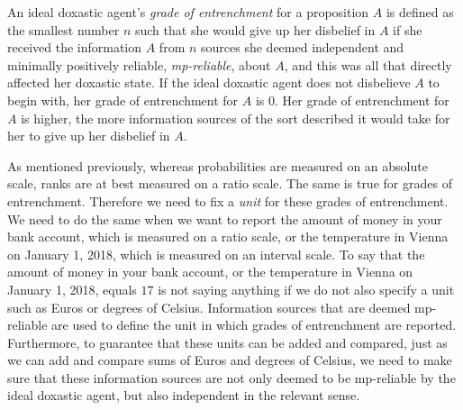 An ideal doxastic agent's \emph{grade of entrenchment} for a proposition $A$ is defined as the smallest number $n$ such that she would give up her disbelief in $A$ if she received the information $A$ from $n$ sources she deemed independent and minimally positively reliable, \textit{mp-reliable}, about $A$, and this was all that directly affected her doxastic state. If the ideal doxastic agent does not disbelieve $A$ to begin with, her grade of entrenchment for $A$ is $0$. Her grade of entrenchment for $A$ is higher, the more information sources of the sort described it would take for her to give up her disbelief in $A$.

As mentioned previously, whereas probabilities are measured on an absolute scale, ranks are at best measured on a ratio scale. The same is true for grades of entrenchment. Therefore we need to fix a \emph{unit} for these grades of entrenchment. We need to do the same when we want to report the amount of money in your bank account, which is measured on a ratio scale, or the temperature in Vienna on January 1, 2018, which is measured on an interval scale. To say that the amount of money in your bank account, or the temperature in Vienna on January 1, 2018, equals $17$ is not saying anything if we do not also specify a unit such as Euros or degrees of Celsius. Information sources that are deemed mp-reliable are used to define the unit in which grades of entrenchment are reported. Furthermore, to guarantee that these units can be added and compared, just as we can add and compare sums of Euros and degrees of Celsius, we need to make sure that these information sources are not only deemed to be mp-reliable by the ideal doxastic agent, but also independent in the relevant sense.


